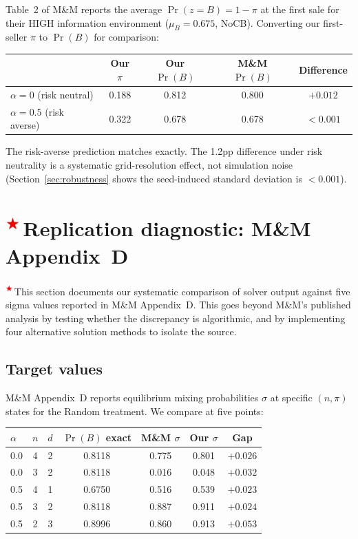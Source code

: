 \documentclass[11pt]{article}
\newcommand{\extension}{\textsuperscript{\textcolor{red}{$\bigstar$}}\,}
\begin{document}
Table~2 of M\&M reports the average $\Pr(z = B) = 1 - \pi$ at the first sale
for their HIGH information environment ($\mu_B = 0.675$, NoCB). Converting
our first-seller $\pi$ to $\Pr(B)$ for comparison:

\begin{center}
\small
\begin{tabular}{lcccc}
\toprule
 & Our $\pi$ & Our $\Pr(B)$ & M\&M $\Pr(B)$ & Difference \\
\midrule
$\alpha = 0$ (risk neutral) & 0.188 & 0.812 & 0.800 & $+0.012$ \\
$\alpha = 0.5$ (risk averse) & 0.322 & 0.678 & 0.678 & $< 0.001$ \\
\bottomrule
\end{tabular}
\end{center}

The risk-averse prediction matches exactly. The 1.2pp difference under risk
neutrality is a systematic grid-resolution effect, not simulation noise
(Section~\ref{sec:robustness} shows the seed-induced standard deviation is
$< 0.001$).

\section{\extension Replication diagnostic: M\&M Appendix~D}
\label{sec:replication}

\extension This section documents our systematic comparison of solver output
against five sigma values reported in M\&M Appendix~D. This goes beyond
M\&M's published analysis by testing whether the discrepancy is algorithmic,
and by implementing four alternative solution methods to isolate the source.

\subsection{Target values}

M\&M Appendix~D reports equilibrium mixing probabilities $\sigma$ at specific
$(n, \pi)$ states for the Random treatment. We compare at five points:

\begin{center}
\small
\begin{tabular}{lcccccc}
\toprule
$\alpha$ & $n$ & $d$ & $\Pr(B)$ exact & M\&M $\sigma$ & Our $\sigma$ & Gap \\
\midrule
0.0 & 4 & 2 & 0.8118 & 0.775 & 0.801 & $+0.026$ \\
0.0 & 3 & 2 & 0.8118 & 0.016 & 0.048 & $+0.032$ \\
0.5 & 4 & 1 & 0.6750 & 0.516 & 0.539 & $+0.023$ \\
0.5 & 3 & 2 & 0.8118 & 0.887 & 0.911 & $+0.024$ \\
0.5 & 2 & 3 & 0.8996 & 0.860 & 0.913 & $+0.053$ \\
\bottomrule
\end{tabular}
\end{center}
\end{document}
